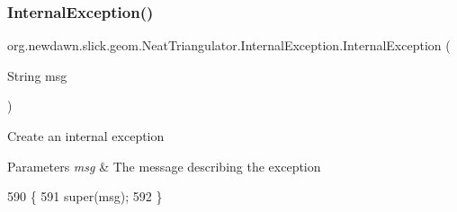 \subsubsection{\texorpdfstring{Internal\+Exception()}{InternalException()}}
{\footnotesize\ttfamily org.\+newdawn.\+slick.\+geom.\+Neat\+Triangulator.\+Internal\+Exception.\+Internal\+Exception (\begin{DoxyParamCaption}\item[{String}]{msg }\end{DoxyParamCaption})\hspace{0.3cm}{\ttfamily [inline]}}

Create an internal exception


\begin{DoxyParams}{Parameters}
{\em msg} & The message describing the exception \\
\hline
\end{DoxyParams}

\begin{DoxyCode}
590                                              \{
591             super(msg);
592         \}
\end{DoxyCode}

